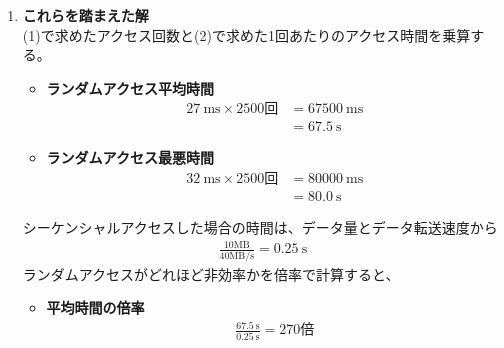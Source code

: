 \documentclass[a4paper,11pt,openany]{ltjsreport}
\begin{document}
\begin{enumerate}[label=(\arabic*)]
\begin{enumerate}[label=(\roman*)]
		      \item \textbf{データ転送時間}\\
		            1トラックあたりの記憶容量が$20\mathrm{kB}$であり、この読み出しに1回転($\SI{10}{\ms}$)かかるとみなすと、$4\mathrm{kB}$のブロックを読み出す時間は、
		            \begin{align*}
			            \SI{10}{\ms} \times \left(\frac{4\mathrm{kB}}{20\mathrm{kB}}\right) = \SI{2}{\ms}
		            \end{align*}
	      \end{enumerate}

	      これらより、1回あたりのアクセス時間は
	      \begin{itemize}
		      \item \textbf{平均アクセス時間}
		            \begin{align*}
			            \SI{20}{\ms} + \SI{5}{\ms} + \SI{2}{\ms} = \SI{27}{\ms}
		            \end{align*}
		      \item \textbf{最悪アクセス時間}
		            \begin{align*}
			            \SI{20}{\ms} + \SI{10}{\ms} + \SI{2}{\ms} = \SI{32}{\ms}
		            \end{align*}
	      \end{itemize}

	\item \textbf{これらを踏まえた解}\\
	      (1)で求めたアクセス回数と(2)で求めた1回あたりのアクセス時間を乗算する。
	      \begin{itemize}
		      \item \textbf{ランダムアクセス平均時間}
		            \begin{align*}
			            \SI{27}{\ms} \times 2500\mathrm{回} & = \SI{67500}{\ms} \\
			                                               & = \SI{67.5}{\s}
		            \end{align*}

		      \item \textbf{ランダムアクセス最悪時間}
		            \begin{align*}
			            \SI{32}{\ms} \times 2500\mathrm{回} & = \SI{80000}{\ms} \\
			                                               & = \SI{80.0}{\s}
		            \end{align*}
	      \end{itemize}
	      シーケンシャルアクセスした場合の時間は、データ量とデータ転送速度から
	      \begin{align*}
		      \frac{10\mathrm{MB}}{40\mathrm{MB/s}} = \SI{0.25}{\s}
	      \end{align*}
	      ランダムアクセスがどれほど非効率かを倍率で計算すると、
	      \begin{itemize}
		      \item \textbf{平均時間の倍率}
		            \begin{align*}
			            \frac{\SI{67.5}{\s}}{\SI{0.25}{\s}} = 270\mathrm{倍}
		            \end{align*}


\end{itemize}
\end{enumerate}
\end{document}
